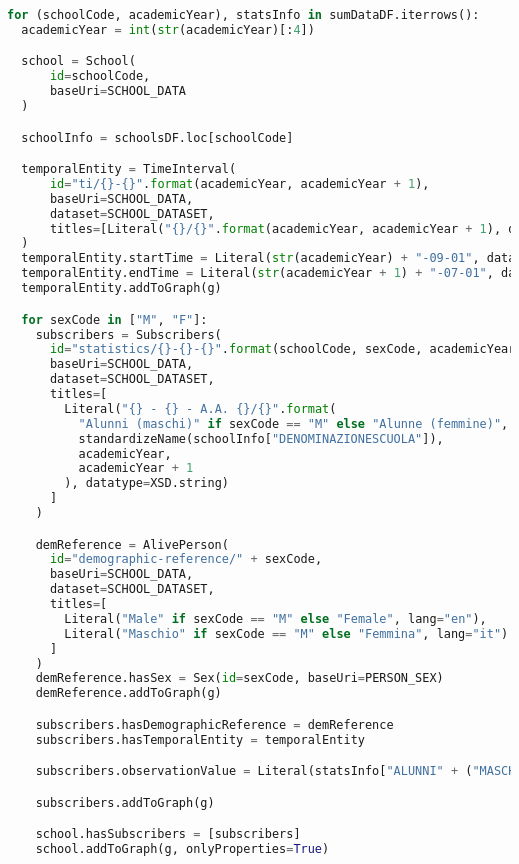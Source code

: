 \begin{lstlisting}[language=python,caption={The part of the code that build the RDF Graph for demographic observations on the school.},label=code:schools-do-py]
for (schoolCode, academicYear), statsInfo in sumDataDF.iterrows():
  academicYear = int(str(academicYear)[:4])

  school = School(
      id=schoolCode,
      baseUri=SCHOOL_DATA
  )

  schoolInfo = schoolsDF.loc[schoolCode]

  temporalEntity = TimeInterval(
      id="ti/{}-{}".format(academicYear, academicYear + 1),
      baseUri=SCHOOL_DATA,
      dataset=SCHOOL_DATASET,
      titles=[Literal("{}/{}".format(academicYear, academicYear + 1), datatype=XSD.string)]
  )
  temporalEntity.startTime = Literal(str(academicYear) + "-09-01", datatype=XSD.date)
  temporalEntity.endTime = Literal(str(academicYear + 1) + "-07-01", datatype=XSD.date)
  temporalEntity.addToGraph(g)

  for sexCode in ["M", "F"]:
    subscribers = Subscribers(
      id="statistics/{}-{}-{}".format(schoolCode, sexCode, academicYear),
      baseUri=SCHOOL_DATA,
      dataset=SCHOOL_DATASET,
      titles=[
        Literal("{} - {} - A.A. {}/{}".format(
          "Alunni (maschi)" if sexCode == "M" else "Alunne (femmine)",
          standardizeName(schoolInfo["DENOMINAZIONESCUOLA"]),
          academicYear,
          academicYear + 1
        ), datatype=XSD.string)
      ]
    )

    demReference = AlivePerson(
      id="demographic-reference/" + sexCode,
      baseUri=SCHOOL_DATA,
      dataset=SCHOOL_DATASET,
      titles=[
        Literal("Male" if sexCode == "M" else "Female", lang="en"),
        Literal("Maschio" if sexCode == "M" else "Femmina", lang="it")
      ]
    )
    demReference.hasSex = Sex(id=sexCode, baseUri=PERSON_SEX)
    demReference.addToGraph(g)

    subscribers.hasDemographicReference = demReference
    subscribers.hasTemporalEntity = temporalEntity

    subscribers.observationValue = Literal(statsInfo["ALUNNI" + ("MASCHI" if sexCode == "M" else "FEMMINE")], datatype=XSD.positiveInteger)

    subscribers.addToGraph(g)

    school.hasSubscribers = [subscribers]
    school.addToGraph(g, onlyProperties=True)
\end{lstlisting}
